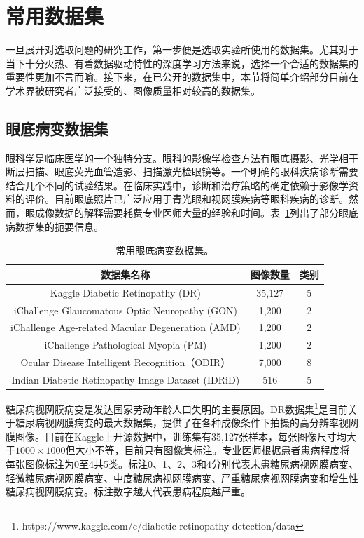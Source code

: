 \section{常用数据集}\label{sec:usually_ds_intro}
一旦展开对选取问题的研究工作，第一步便是选取实验所使用的数据集。尤其对于当下十分火热、有着数据驱动特性的深度学习方法来说，选择一个合适的数据集的重要性更加不言而喻。接下来，在已公开的数据集中，本节将简单介绍部分目前在学术界被研究者广泛接受的、图像质量相对较高的数据集。

\subsection{眼底病变数据集}\label{subsec:original_dr_dataset_intro}
眼科学是临床医学的一个独特分支。眼科的影像学检查方法有眼底摄影、光学相干断层扫描、眼底荧光血管造影、扫描激光检眼镜等。一个明确的眼科疾病诊断需要结合几个不同的试验结果。在临床实践中，诊断和治疗策略的确定依赖于影像学资料的评价。目前眼底照片已广泛应用于青光眼和视网膜疾病等眼科疾病的诊断。然而，眼成像数据的解释需要耗费专业医师大量的经验和时间。表~\ref{tab:datasets_info}列出了部分眼底病数据集的扼要信息。
\begin{table}[h]
	\centering
	\caption[常用眼底病变数据集]{常用眼底病变数据集。}
	\label{tab:datasets_info}
	\begin{tabular}{c|c|c}
		\toprule[2pt]
		数据集名称 & 图像数量 & 类别 \\
		\midrule[2pt]
		Kaggle Diabetic Retinopathy (DR)	& 35,127	& 5	 \\
		\hline                         
		iChallenge Glaucomatous Optic Neuropathy (GON)    & 1,200    & 2 \\ \hline
		iChallenge Age-related Macular Degeneration (AMD) & 1,200    & 2  \\ \hline
		iChallenge Pathological Myopia (PM)               & 1,200    & 2 \\ \hline
		Ocular Disease Intelligent Recognition（ODIR） & 7,000 & 8 \\ \hline
		
		Indian Diabetic Retinopathy Image Dataset (IDRiD) & 516 & 5  \\
		\bottomrule[2pt]
	\end{tabular}
\end{table}

糖尿病视网膜病变是发达国家劳动年龄人口失明的主要原因。DR数据集\footnote{https://www.kaggle.com/c/diabetic-retinopathy-detection/data}是目前关于糖尿病视网膜病变的最大数据集，提供了在各种成像条件下拍摄的高分辨率视网膜图像。目前在Kaggle上开源数据中，训练集有35,127张样本，每张图像尺寸均大于$1000\times 1000$但大小不等，目前只有图像集标注。专业医师根据患者患病程度将每张图像标注为0至4共5类。标注0、1、2、3和4分别代表未患糖尿病视网膜病变、轻微糖尿病视网膜病变、中度糖尿病视网膜病变、严重糖尿病视网膜病变和增生性糖尿病视网膜病变。标注数字越大代表患病程度越严重。

